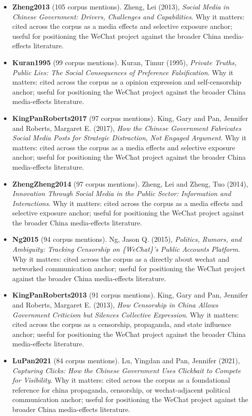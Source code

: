 \documentclass[12pt]{article}
\begin{document}
        \begin{itemize}[leftmargin=1.5em]
        \item \textbf{Zheng2013} (105 corpus mentions). Zheng, Lei (2013), \emph{Social Media in Chinese Government: Drivers, Challenges and Capabilities}. Why it matters: cited across the corpus as a media effects and selective exposure anchor; useful for positioning the WeChat project against the broader China media-effects literature.
\item \textbf{Kuran1995} (99 corpus mentions). Kuran, Timur (1995), \emph{Private Truths, Public Lies: The Social Consequences of Preference Falsification}. Why it matters: cited across the corpus as a opinion expression and self-censorship anchor; useful for positioning the WeChat project against the broader China media-effects literature.
\item \textbf{KingPanRoberts2017} (97 corpus mentions). King, Gary and Pan, Jennifer and Roberts, Margaret E. (2017), \emph{How the Chinese Government Fabricates Social Media Posts for Strategic Distraction, Not Engaged Argument}. Why it matters: cited across the corpus as a media effects and selective exposure anchor; useful for positioning the WeChat project against the broader China media-effects literature.
\item \textbf{ZhengZheng2014} (97 corpus mentions). Zheng, Lei and Zheng, Tuo (2014), \emph{Innovation Through Social Media in the Public Sector: Information and Interactions}. Why it matters: cited across the corpus as a media effects and selective exposure anchor; useful for positioning the WeChat project against the broader China media-effects literature.
\item \textbf{Ng2015} (94 corpus mentions). Ng, Jason Q. (2015), \emph{Politics, Rumors, and Ambiguity: Tracking Censorship on \{WeChat\}'s Public Accounts Platform}. Why it matters: cited across the corpus as a directly about wechat and networked communication anchor; useful for positioning the WeChat project against the broader China media-effects literature.
\item \textbf{KingPanRoberts2013} (91 corpus mentions). King, Gary and Pan, Jennifer and Roberts, Margaret E. (2013), \emph{How Censorship in China Allows Government Criticism but Silences Collective Expression}. Why it matters: cited across the corpus as a censorship, propaganda, and state influence anchor; useful for positioning the WeChat project against the broader China media-effects literature.
\item \textbf{LuPan2021} (84 corpus mentions). Lu, Yingdan and Pan, Jennifer (2021), \emph{Capturing Clicks: How the Chinese Government Uses Clickbait to Compete for Visibility}. Why it matters: cited across the corpus as a foundational reference for china propaganda, censorship, or wechat-adjacent political communication anchor; useful for positioning the WeChat project against the broader China media-effects literature.

\end{itemize}
\end{document}
